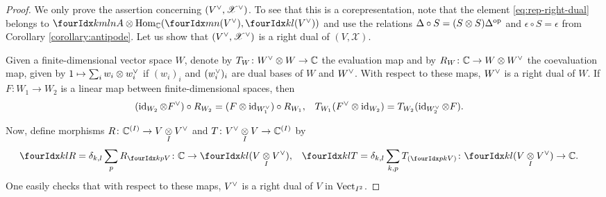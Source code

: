  \begin{proof}
    We only prove the assertion concerning
    $(V^{\vee},\mathscr{X}^{\vee})$. To see that this is a corepresentation, note that the element
    \eqref{eq:rep-right-dual} belongs to $\Gr{A}{k}{l}{m}{n} \otimes
    \Hom_{\C}(\Gru{(\dual{V})}{m}{n},\Gru{(\dual{V})}{k}{l})$ and use
    the relations $\Delta \circ S = (S \otimes S)\Delta^{\operatorname{\mathrm{op}}}$ and
    $\epsilon \circ S = \epsilon$ from Corollary
    \ref{corollary:antipode}.  
    Let us show that $(V^{\vee},\mathscr{X}^{\vee})$ is a right dual
    of $(V,\mathscr{X})$.

    Given a finite-dimensional vector space $W$, denote by $T_{W}
    \colon W^{\vee} \otimes W \to \mathbb{C}$ the evaluation map and by $R_{W}
    \colon \mathbb{C} \to W \otimes W^{\vee}$ the coevaluation map, given by
    $1\mapsto \sum_{i} w_{i} \otimes w_{i}^{\vee}$ if $(w_{i})_{i}$
    and $(w_{i}^{\vee})_{i}$ are dual bases of $W$ and
    $W^{\vee}$. With respect to these maps, $W^{\vee}$ is a right dual
    of $W$. If $F\colon W_{1}\to W_{2}$ is a linear map between
    finite-dimensional spaces, then
\begin{align} \label{eq:coev-vee} (\operatorname{id}_{W_{2}} \otimes F^{\vee}) \circ R_{W_{2}} &= (F \otimes \operatorname{id}_{W_{1}^{\vee}})\circ
  R_{W_{1}}, &
T_{W_{1}}(F^{\vee}
  \otimes \operatorname{id}_{W_{2}})&=  T_{W_{2}}(\operatorname{id}_{W_{2}^{\vee}} \otimes F).
\end{align}

Now, define morphisms $R \colon \mathbb{C}^{(I)} \to V\underset{I}{\otimes} V^{\vee}$ and
$T \colon V^{\vee} \underset{I}{\otimes} V \to \mathbb{C}^{(I)}$ by
\begin{align*}
  \Gru{R}{k}{l} &= \delta_{k,l} \sum_{p} R_{\footnotesize\Gru{V}{k}{p}} \colon
  \C \to 
    \Gru{(V\itimes \dual{V})}{k}{l}, &
  \Gru{T}{k}{l} &= \delta_{k,l} \sum_{k,p} T_{(\Gru{V}{p}{k})} \colon
    \Gru{(V\itimes \dual{V})}{k}{l} \to \C.
\end{align*}
One easily checks that with respect to these maps, $V^{\vee}$ is a
right dual of $V$ in $\mathrm{Vect}_{I^{2}}$. 


\end{proof}
